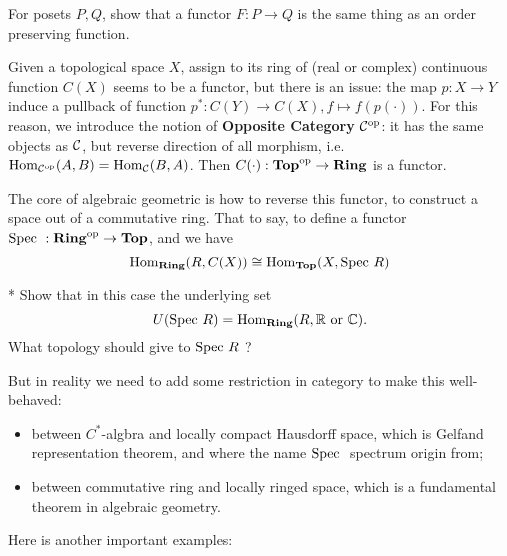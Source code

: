 \begin{exercise}
For posets $P,Q$, show that a functor $F:P\to Q$ is the same thing as an order preserving function.  
\end{exercise}

\begin{example}
  Given a topological space $X$, assign to its ring of (real or complex) continuous function $C(X)$ seems to be a functor, but there is an issue: the map $p:X\to Y$ induce a pullback of function $p^*:C(Y)\to C(X), f \mapsto f(p(\cdot))$. For this reason, we introduce the notion of \textbf{Opposite Category} $\mathcal{C}^{\mathrm{op}}$: it has the same objects as $\mathcal{C}$, but reverse direction of all morphism, i.e. $ \mathrm{Hom}_{\mathcal{C}^{\mathrm{op}}}(A,B)= \mathrm{Hom}_{\mathcal{C}}(B,A)$. Then $C(\cdot):\mathbf{Top}^{\mathrm{op}} \to \mathbf{Ring}$ is a functor.
\end{example}
\begin{remark}
 The core of algebraic geometric is how to reverse this functor, to construct a space out of a commutative ring. That to say, to define a functor $\mathrm{Spec}\  :\mathbf{Ring}^{\mathrm{op}} \to \mathbf{Top}$, and we have
 \[
   \mathrm{Hom}_{\mathbf{Ring}}(R, C(X)) \cong \mathrm{Hom}_{\mathbf{Top}}( X,\mathrm{Spec}\  R)
 \]
 \begin{exercise}*
   Show that in this case the underlying set $$ U(\mathrm{Spec}\  R) = \mathrm{Hom}_{\mathbf{Ring}}(R, \mathbb{R} \text{ or } \mathbb{C}). $$ What topology should give to $\mathrm{Spec}\  R$ ?
 \end{exercise}
 But in reality we need to add some restriction in category to make this well-behaved:
\begin{itemize}
  \item between $C^*$-algbra and locally compact Hausdorff space, which is Gelfand representation theorem, and where the name $\mathrm{Spec}\ $ spectrum origin from;
  \item between commutative ring and locally ringed space, which is a fundamental theorem in algebraic geometry.
\end{itemize}
\end{remark}

Here is another important examples:

